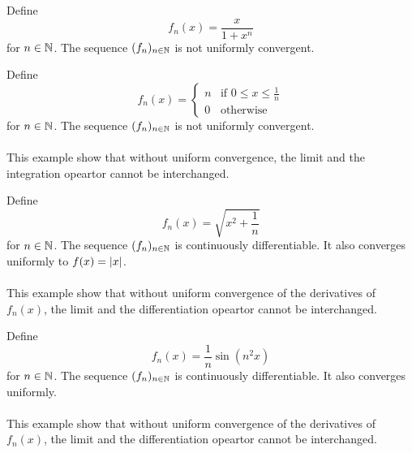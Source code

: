 \documentclass[a4paper]{article}
\begin{document}
\begin{eg}{}{} Define $$f_n(x)=\frac{x}{1+x^n}$$ for $n\in\mathbb{N}$. The sequence $(f_n)_{n\in\mathbb{N}}$ is not uniformly convergent. 
\end{eg}

\begin{eg}{}{} Define $$f_n(x)=\begin{cases}
n & \text{if }0\leq x\leq\frac{1}{n}\\
0 & \text{otherwise }
\end{cases}$$ for $n\in\mathbb{N}$. The sequence $(f_n)_{n\in\mathbb{N}}$ is not uniformly convergent. \\~\\
This example show that without uniform convergence, the limit and the integration opeartor cannot be interchanged. 
\end{eg}

\begin{eg}{}{} Define $$f_n(x)=\sqrt{x^2+\frac{1}{n}}$$ for $n\in\mathbb{N}$. The sequence $(f_n)_{n\in\mathbb{N}}$ is continuously differentiable. It also converges uniformly to $f(x)=\abs{x}$. \\~\\
This example show that without uniform convergence of the derivatives of $f_n(x)$, the limit and the differentiation opeartor cannot be interchanged. 
\end{eg}

\begin{eg}{}{} Define $$f_n(x)=\frac{1}{n}\sin(n^2x)$$ for $n\in\mathbb{N}$. The sequence $(f_n)_{n\in\mathbb{N}}$ is continuously differentiable. It also converges uniformly. \\~\\
This example show that without uniform convergence of the derivatives of $f_n(x)$, the limit and the differentiation opeartor cannot be interchanged. 
\end{eg}
\end{document}
